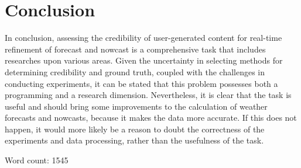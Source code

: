 \documentclass[conference]{IEEEtran}
\begin{document}
\section{Conclusion}

In conclusion, assessing the credibility of user-generated content for real-time refinement of forecast and nowcast is a comprehensive task that includes researches upon various areas. Given the uncertainty in selecting methods for determining credibility and ground truth, coupled with the challenges in conducting experiments, it can be stated that this problem possesses both a programming and a research dimension. Nevertheless, it is clear that the task is useful and should bring some improvements to the calculation of weather forecasts and nowcasts, because it makes the data more accurate. If this does not happen, it would more likely be a reason to doubt the correctness of the experiments and data processing, rather than the usefulness of the task.




Word count: 1545
\end{document}
